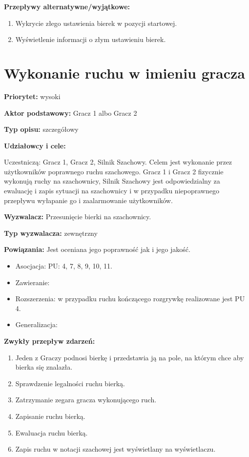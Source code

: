 \documentclass[12pt]{article}
\begin{document}
\textbf{Przepływy alternatywne/wyjątkowe:}
\begin{enumerate}
\item Wykrycie złego ustawienia bierek w pozycji startowej.
\item Wyświetlenie informacji o złym ustawieniu bierek.
\end{enumerate}

\section{Wykonanie ruchu w imieniu gracza}
\textbf{Priorytet:} wysoki

\textbf{Aktor podstawowy:} Gracz 1 albo Gracz 2

\textbf{Typ opisu:} szczegółowy

\textbf{Udziałowcy i cele:} 

Uczestniczą: Gracz 1, Gracz 2, Silnik Szachowy. Celem jest wykonanie przez użytkowników poprawnego ruchu szachowego. Gracz 1 i Gracz 2 fizycznie wykonują ruchy na szachownicy, Silnik Szachowy jest odpowiedzialny za ewaluację i zapis sytuacji na szachownicy i w przypadku niepoprawnego przepływu wyłapanie go i zaalarmowanie użytkowników. 

\textbf{Wyzwalacz:} Przesunięcie bierki na szachownicy.

\textbf{Typ wyzwalacza:} zewnętrzny

\textbf{Powiązania:} Jest oceniana jego poprawność jak i jego jakość.
	\begin{itemize}\item Asocjacja: PU: 4, 7, 8, 9, 10, 11.
	\item Zawieranie: 
	\item Rozszerzenia: w przypadku ruchu kończącego rozgrywkę realizowane jest PU 4.
	\item Generalizacja: 
\end{itemize} 
\textbf{Zwykły przepływ zdarzeń:}  
\begin{enumerate}
\item Jeden z Graczy podnosi bierkę i przedstawia ją na pole, na którym chce aby bierka się znalazła.
\item Sprawdzenie legalności ruchu bierką.
\item Zatrzymanie zegara gracza wykonującego ruch.
\item Zapisanie ruchu bierką.
\item Ewaluacja ruchu bierką.
\item Zapis ruchu w notacji szachowej jest wyświetlany na wyświetlaczu.
\end{enumerate} 
\end{document}
